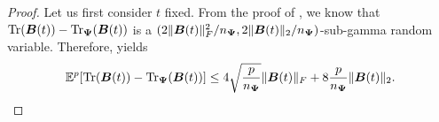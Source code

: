 \begin{proof}
    Let us first consider $t$ fixed. From the proof of \cite[Theorem 1]{cortinovis-2022-randomized-trace}, we know that $\operatorname{Tr}(\boldsymbol{B}(t)) - \operatorname{Tr}_{\boldsymbol{\Psi}}(\boldsymbol{B}(t))$ is a $(2 \lVert \boldsymbol{B}(t) \rVert _F^2 / n_{\boldsymbol{\Psi}}, 2 \lVert \boldsymbol{B}(t) \rVert _2 / n_{\boldsymbol{\Psi}})$-sub-gamma random variable. Therefore,  yields
    \begin{equation}
        \mathbb{E}^{p}[\operatorname{Tr}(\boldsymbol{B}(t)) - \operatorname{Tr}_{\boldsymbol{\Psi}}(\boldsymbol{B}(t))] \leq 4  \sqrt{\frac{p}{n_{\boldsymbol{\Psi}}}} \lVert \boldsymbol{B}(t) \rVert _F + 8 \frac{p}{n_{\boldsymbol{\Psi}}} \lVert \boldsymbol{B}(t) \rVert _2.
        \label{equ:moment-bound-hutchinson}
    \end{equation}

\end{proof}
